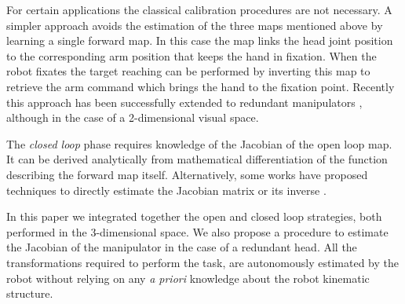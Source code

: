 For certain applications the classical calibration procedures are not 
necessary. A simpler approach \cite{blackburn94learning} avoids the estimation 
of the three maps mentioned above by learning a single forward map. 
In this case
the map links the head joint position to the corresponding arm position that
keeps the hand in fixation. When the robot fixates the target reaching can be 
performed by inverting this map to retrieve the arm command which brings
the hand to the fixation point. Recently this approach has been successfully 
extended to redundant manipulators \cite{lopes06learning}, although in the 
case of a 2-dimensional visual space.

The {\em closed loop} phase requires knowledge of the Jacobian of the open loop map.
It can be derived analytically from 
mathematical differentiation of the function describing the forward map itself. 
Alternatively, some works have proposed techniques to directly estimate the Jacobian matrix
\cite{Hosoda94versatile,Mansard06jacobian} or its inverse 
\cite{Lapreste04efficient}.

In this paper we integrated together the 
open \cite{blackburn94learning,Mansard06jacobian} and closed 
\cite{Hosoda94versatile,lopes06learning} loop 
strategies, both performed in the 3-dimensional space.
We also propose a procedure to estimate 
the Jacobian of the manipulator in the case of a redundant head. All the 
transformations required to perform the task, are autonomously estimated by the robot 
 without relying on any \emph{a priori} knowledge about the robot 
kinematic structure.
